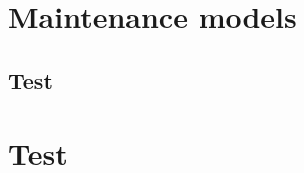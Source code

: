 
\cleardoublepage
\appendix
\chapter{Maintenance models}
\section{Test}\label{testchapter}
\chapter{Test}
